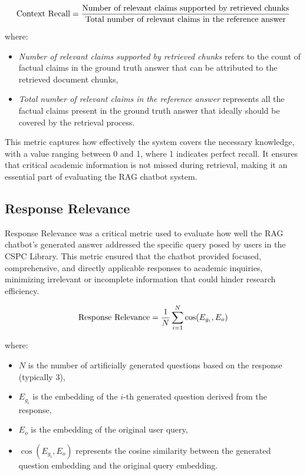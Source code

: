 \begin{refsection}
\begin{equation}
\centering
\text{Context Recall} = \frac{\text{Number of relevant claims supported by retrieved chunks}}{\text{Total number of relevant claims in the reference answer}}
\end{equation}

where:

\begin{itemize}
    \item \textit{Number of relevant claims supported by retrieved chunks} refers to the count of factual claims in the ground truth answer that can be attributed to the retrieved document chunks,
    \item \textit{Total number of relevant claims in the reference answer} represents all the factual claims present in the ground truth answer that ideally should be covered by the retrieval process.
\end{itemize}

This metric captures how effectively the system covers the necessary knowledge, with a value ranging between 0 and 1, where 1 indicates perfect recall. It ensures that critical academic information is not missed during retrieval, making it an essential part of evaluating the RAG chatbot system.


\subsection*{Response Relevance}

Response Relevance was a critical metric used to evaluate how well the RAG chatbot's generated answer addressed the specific query posed by users in the CSPC Library. This metric ensured that the chatbot provided focused, comprehensive, and directly applicable responses to academic inquiries, minimizing irrelevant or incomplete information that could hinder research efficiency.

\begin{equation}
\centering
\text{Response Relevance} = \frac{1}{N} \sum_{i=1}^{N} \cos(E_{g_i}, E_o)
\end{equation}

where:
\begin{itemize}
    \item $N$ is the number of artificially generated questions based on the response (typically 3),
    \item $E_{g_i}$ is the embedding of the $i$-th generated question derived from the response,
    \item $E_o$ is the embedding of the original user query,
    \item $\cos(E_{g_i}, E_o)$ represents the cosine similarity between the generated question embedding and the original query embedding.
\end{itemize}


\end{refsection}
